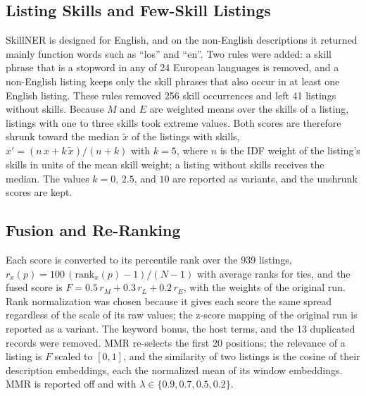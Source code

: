 \documentclass[CHICAGO]{USG}
\begin{document}
\subsection{Listing Skills and Few-Skill Listings}
\label{sec:skills}
SkillNER is designed for English, and on the non-English descriptions it returned mainly function words such as ``los'' and ``en''. Two rules were added: a skill phrase that is a stopword in any of 24 European languages is removed, and a non-English listing keeps only the skill phrases that also occur in at least one English listing. %
These rules removed 256 skill occurrences and left 41 listings without skills. %
Because $M$ and $E$ are weighted means over the skills of a listing, listings with one to three skills took extreme values. Both scores are therefore shrunk toward the median $\tilde{x}$ of the listings with skills, $x' = (n\,x + k\,\tilde{x})/(n+k)$ with $k=5$, where $n$ is the IDF weight of the listing's skills in units of the mean skill weight; a listing without skills receives the median. %
The values $k=0$, $2.5$, and $10$ are reported as variants, and the unshrunk scores are kept.

\subsection{Fusion and Re-Ranking}
\label{sec:fusion}
Each score is converted to its percentile rank over the 939 listings, $r_x(p)=100\,(\mathrm{rank}_x(p)-1)/(N-1)$ with average ranks for ties, and the fused score is $F=0.5\,r_M+0.3\,r_L+0.2\,r_E$, with the weights of the original run. %
Rank normalization was chosen because it gives each score the same spread regardless of the scale of its raw values; the z-score mapping of the original run is reported as a variant. The keyword bonus, the host terms, and the 13 duplicated records were removed. %
MMR re-selects the first 20 positions; the relevance of a listing is $F$ scaled to $[0,1]$, and the similarity of two listings is the cosine of their description embeddings, each the normalized mean of its window embeddings. MMR is reported off and with $\lambda\in\{0.9,0.7,0.5,0.2\}$. %
\end{document}

